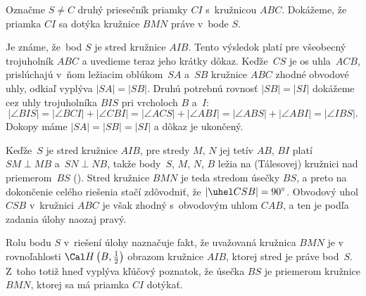 {%
Označme $S\ne C$ druhý priesečník priamky $CI$
s~kružnicou $ABC$.
Dokážeme, že priamka $CI$
sa dotýka kružnice $BMN$ práve v~bode $S$.

Je známe, že~bod $S$ je stred kružnice $AIB$. Tento výsledok
platí pre všeobecný trojuholník $ABC$ a uvedieme teraz jeho krátky dôkaz.
Keďže~$CS$ je os uhla~$ACB$, prislúchajú v~ňom ležiacim oblúkom~$SA$ a~$SB$
kružnice $ABC$ zhodné obvodové uhly, odkiaľ vyplýva $|SA|=|SB|$.
Druhú potrebnú rovnosť $|SB|=|SI|$ dokážeme cez uhly
trojuholníka $BIS$ pri vrcholoch $B$ a~$I$:
$$
|\angle BIS|=
|\angle BCI| + |\angle CBI| =
|\angle ACS| + |\angle ABI| =
|\angle ABS| + |\angle ABI| =
|\angle IBS|.
$$
Dokopy máme $|SA|=|SB|=|SI|$ a dôkaz je ukončený.

Keďže~$S$ je stred kružnice $AIB$, pre stredy $M$, $N$ jej
tetív $AB$, $BI$ platí $SM\perp MB$ a~$SN\perp NB$, takže body~$S$, $M$, $N$, $B$
ležia na (Tálesovej) kružnici nad priemerom~$BS$ (\obr). Stred kružnice
$BMN$ je teda stredom úsečky $BS$, a preto na dokončenie celého
riešenia stačí zdôvodniť, že $|\uhel CSB|=90^\circ$. Obvodový uhol
$CSB$ v~kružnici $ABC$ je však zhodný s~obvodovým uhlom $CAB$, a
ten je podľa zadania úlohy naozaj pravý.
%

\Pozn
Rolu bodu $S$ v~riešení úlohy naznačuje fakt, že
uvažovaná kružnica $BMN$ je v rovnoľahlosti
${\Cal H}\left(B,\frac12\right)$ obrazom kružnice $AIB$, ktorej
stred je práve bod~$S$. Z~toho totiž hneď vyplýva kľúčový poznatok, že
úsečka $BS$ je priemerom kružnice $BMN$, ktorej sa má priamka
$CI$ dotýkať.}

